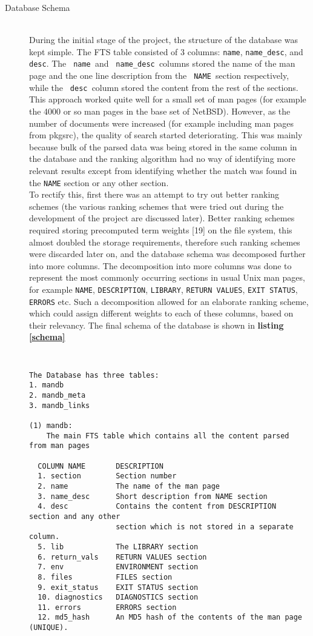 \documentclass[letterpaper,twocolumn,10pt]{article}
\begin{document}
\begin{description}
\item[Database Schema] \hfill \\
During the initial stage of the project, the structure of the database was kept
simple. The FTS table consisted of 3 columns:
{\tt name}, {\tt name\_desc}, and {\tt desc}. The
{\tt
name
}and
{\tt
name\_desc
}columns stored the name of the man page and the one line description from the
{\tt
NAME
}section respectively, while the
{\tt
desc
}column stored the content from the rest of the sections. This approach worked
quite well for a small set of man pages (for example the 4000 or so man pages in
the base set of NetBSD). However, as the number of documents were increased (for example including man pages from pkgsrc), the quality of search started deteriorating. This was mainly because bulk of the parsed data was being stored
in the same column in the database and the ranking algorithm had no way of
identifying more relevant results except from identifying whether the match was found in the {\tt NAME} section or any other section. \\

To rectify this, first there was an attempt to try out better ranking schemes
(the various ranking schemes that were tried out during the development of the
project are discussed later). Better ranking schemes required storing precomputed
term weights [19] on the file system, this almost doubled the storage requirements, therefore such ranking schemes were discarded later on, and the
database schema was decomposed further into more columns. The decomposition into
more columns was done to represent the most commonly occurring sections in usual Unix man pages, for example
{\tt NAME}, {\tt DESCRIPTION}, {\tt LIBRARY}, {\tt RETURN VALUES},
{\tt EXIT STATUS}, {\tt ERRORS}
etc. Such a decomposition allowed for an elaborate ranking scheme, which could
assign different weights to each of these columns, based on their relevancy. The
final schema of the database is shown in {\bf listing \ref{schema}}
{\tt \small
{}
\begin{lstlisting}[float=*]
The Database has three tables:
1. mandb
2. mandb_meta
3. mandb_links

(1) mandb:
    The main FTS table which contains all the content parsed from man pages

  COLUMN NAME       DESCRIPTION
  1. section        Section number
  2. name           The name of the man page  
  3. name_desc      Short description from NAME section  
  4. desc           Contains the content from DESCRIPTION section and any other
                    section which is not stored in a separate column.
  5. lib            The LIBRARY section
  6. return_vals    RETURN VALUES section
  7. env            ENVIRONMENT section
  8. files          FILES section
  9. exit_status    EXIT STATUS section
  10. diagnostics   DIAGNOSTICS section
  11. errors        ERRORS section
  12. md5_hash      An MD5 hash of the contents of the man page (UNIQUE).
  

\end{lstlisting}}
\end{description}
\end{document}
